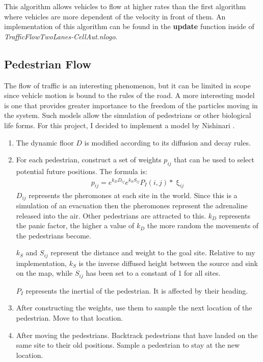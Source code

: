 \documentclass{article}%
\begin{document}
    This algorithm allows vehicles to flow at higher rates than the first algorithm where vehicles are more dependent of the velocity in front of them. An implementation of this algorithm can be found in the {\bf update} function inside of {\it TrafficFlowTwoLanes-CellAut.nlogo}. 

    \subsection{ Pedestrian Flow }
    The flow of traffic is an interesting phenomenon, but it can be limited in scope since vehicle motion is bound to the rules of the road. A more interesting model is one that provides greater importance to the freedom of the particles moving in the system. Such models allow the simulation of pedestrians or other biological life forms. For this project, I decided to implement a model by Nishinari \cite{kats:crowd-flow}.  

    \begin{enumerate}
        \item The dynamic floor $D$ is modified according to its diffusion and decay rules. 
        \item For each pedestrian, construct a set of weights $p_{ij}$ that can be used to select potential future positions. The formula is:
        \begin{align*}
            p_{ij} = e^{k_DD_{ij}}e^{k_SS_{ij}}P_I(i, j) * \upxi_{ij} 
        \end{align*}
        $D_{ij}$ represents the pheromones at each site in the world. Since this is a simulation of an evacuation then the pheromones represent the adrenaline released into the air. Other pedestrians are attracted to this. $k_D$ represents the panic factor, the higher a value of $k_D$ the more random the movements of the pedestrians become. 

        $k_S$ and $S_{ij}$ represent the distance and weight to the goal site. Relative to my implementation, $k_S$ is the inverse diffused height between the source and sink on the map, while $S_{ij}$ has been set to a constant of 1 for all sites. 

        $P_I$ represents the inertial of the pedestrian. It is affected by their heading. 
        \item After constructing the weights, use them to sample the next location of the pedestrian. Move to that location. 
        \item After moving the pedestrians. Backtrack pedestrians that have landed on the same site to their old positions. Sample a pedestrian to stay at the new location.
        \tem 
\end{enumerate}
\end{document}
